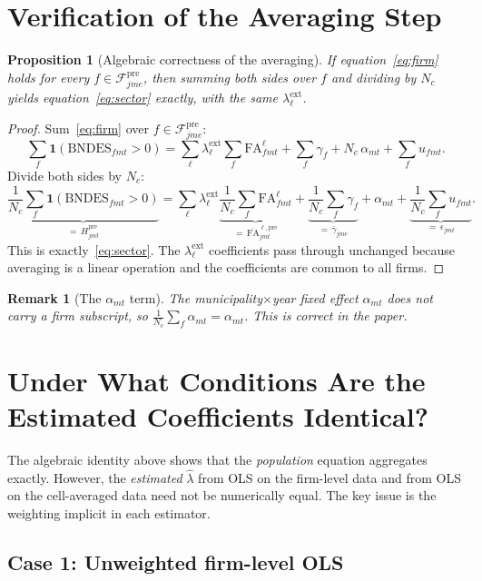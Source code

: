 \documentclass{article}
\newcommand{\FA}{\mathrm{FA}}
\newcommand{\ind}{\mathbf{1}}
\newcommand{\cFpre}{\mathcal{F}^{\mathrm{pre}}}
\theoremstyle{plain}
\newtheorem{proposition}{Proposition}
\newtheorem{remark}{Remark}
\begin{document}
\section{Verification of the Averaging Step}

\begin{proposition}[Algebraic correctness of the averaging]
If equation~\eqref{eq:firm} holds for every $f\in\cFpre_{jme}$, then
summing both sides over $f$ and dividing by $N_c$ yields
equation~\eqref{eq:sector} exactly, with the same $\lambda^\mathrm{ext}_\ell$.
\end{proposition}

\begin{proof}
Sum~\eqref{eq:firm} over $f\in\cFpre_{jme}$:
\[
  \sum_f \ind(\text{BNDES}_{fmt}>0)
  = \sum_\ell \lambda^\mathrm{ext}_\ell \sum_f \FA^\ell_{fmt}
  + \sum_f \gamma_f
  + N_c\,\alpha_{mt}
  + \sum_f u_{fmt}.
\]
Divide both sides by $N_c$:
\[
  \underbrace{\frac{1}{N_c}\sum_f \ind(\text{BNDES}_{fmt}>0)}_{=\, H^\mathrm{pre}_{jmt}}
  = \sum_\ell \lambda^\mathrm{ext}_\ell
    \underbrace{\frac{1}{N_c}\sum_f \FA^\ell_{fmt}}_{=\,\overline{\FA}^{\ell,\mathrm{pre}}_{jmt}}
  + \underbrace{\frac{1}{N_c}\sum_f \gamma_f}_{=\,\bar\gamma_{jme}}
  + \alpha_{mt}
  + \underbrace{\frac{1}{N_c}\sum_f u_{fmt}}_{=\,\epsilon_{jmt}}.
\]
This is exactly~\eqref{eq:sector}.  The $\lambda^\mathrm{ext}_\ell$
coefficients pass through unchanged because averaging is a linear operation
and the coefficients are common to all firms.
\end{proof}

\begin{remark}[The $\alpha_{mt}$ term]
The municipality$\times$year fixed effect $\alpha_{mt}$ does not carry a firm
subscript, so $\frac{1}{N_c}\sum_f \alpha_{mt} = \alpha_{mt}$.  This is
correct in the paper.
\end{remark}

\section{Under What Conditions Are the Estimated Coefficients Identical?}

The algebraic identity above shows that the \emph{population} equation
aggregates exactly.  However, the \emph{estimated} $\hat\lambda$ from OLS on
the firm-level data and from OLS on the cell-averaged data need not be
numerically equal.  The key issue is the weighting implicit in each estimator.

\subsection{Case 1: Unweighted firm-level OLS}
\end{document}
